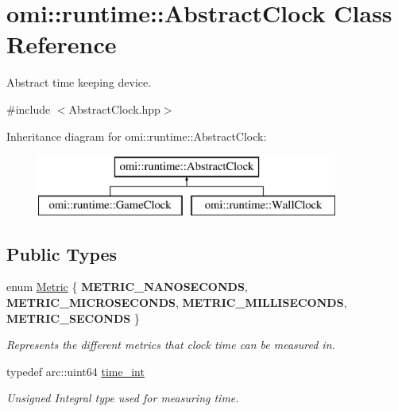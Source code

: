 \hypertarget{classomi_1_1runtime_1_1_abstract_clock}{}\section{omi\+:\+:runtime\+:\+:Abstract\+Clock Class Reference}
\label{classomi_1_1runtime_1_1_abstract_clock}


Abstract time keeping device.  




{\ttfamily \#include $<$Abstract\+Clock.\+hpp$>$}

Inheritance diagram for omi\+:\+:runtime\+:\+:Abstract\+Clock\+:\begin{figure}[H]
\begin{center}
\leavevmode
\includegraphics[height=2.000000cm]{classomi_1_1runtime_1_1_abstract_clock}
\end{center}
\end{figure}
\subsection*{Public Types}
\begin{DoxyCompactItemize}
\item 
\hypertarget{classomi_1_1runtime_1_1_abstract_clock_a6af6e30a02165469ffcdcbd512d47a1b}{}enum \hyperlink{classomi_1_1runtime_1_1_abstract_clock_a6af6e30a02165469ffcdcbd512d47a1b}{Metric} \{ {\bfseries M\+E\+T\+R\+I\+C\+\_\+\+N\+A\+N\+O\+S\+E\+C\+O\+N\+D\+S}, 
{\bfseries M\+E\+T\+R\+I\+C\+\_\+\+M\+I\+C\+R\+O\+S\+E\+C\+O\+N\+D\+S}, 
{\bfseries M\+E\+T\+R\+I\+C\+\_\+\+M\+I\+L\+L\+I\+S\+E\+C\+O\+N\+D\+S}, 
{\bfseries M\+E\+T\+R\+I\+C\+\_\+\+S\+E\+C\+O\+N\+D\+S}
 \}\label{classomi_1_1runtime_1_1_abstract_clock_a6af6e30a02165469ffcdcbd512d47a1b}
\begin{DoxyCompactList}\small\item\em Represents the different metrics that clock time can be measured in. \end{DoxyCompactList}
\item 
\hypertarget{classomi_1_1runtime_1_1_abstract_clock_af2122541388aea885afc08e8135340f7}{}typedef arc\+::uint64 \hyperlink{classomi_1_1runtime_1_1_abstract_clock_af2122541388aea885afc08e8135340f7}{time\+\_\+int}\label{classomi_1_1runtime_1_1_abstract_clock_af2122541388aea885afc08e8135340f7}

\begin{DoxyCompactList}\small\item\em Unsigned Integral type used for measuring time. \end{DoxyCompactList}\end{DoxyCompactItemize}
